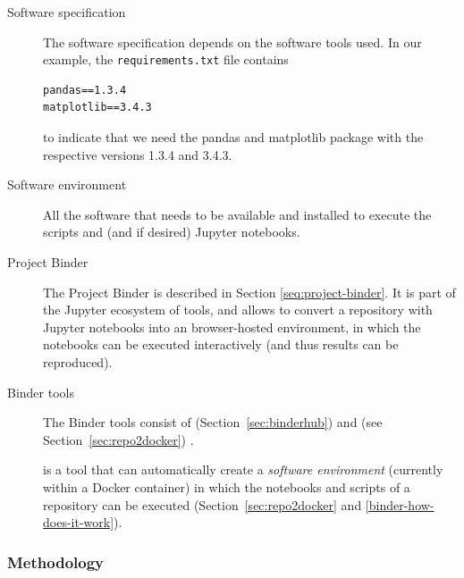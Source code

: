 \begin{description}
\item[Software specification] The software specification depends on the software
  tools used. In our example, the \texttt{requirements.txt} file contains
\begin{verbatim}
pandas==1.3.4
matplotlib==3.4.3
\end{verbatim}
to indicate that we need the pandas and matplotlib package with the respective
versions 1.3.4 and 3.4.3.

\item[Software environment] All the software that needs to be available and
  installed to execute the scripts and (and if desired) Jupyter notebooks.

\item[Project Binder] The Project Binder is described in Section
\ref{seq:project-binder}. It is part of the Jupyter ecosystem of tools, and
allows to convert a repository with Jupyter notebooks into an browser-hosted
environment, in which the notebooks can be executed interactively (and thus
results can be reproduced).

\item[Binder tools] The Binder tools consist of \binderhub{}
  (Section~\ref{sec:binderhub}) and \repotodocker{} (see
  Section~\ref{sec:repo2docker}) .

\item[\repotodocker] \repotodocker{} is a tool that can automatically create a
\emph{software environment} (currently within a Docker container) in which the
notebooks and scripts of a repository can be executed
(Section~\ref{sec:repo2docker} and \ref{binder-how-does-it-work}).
\end{description}




% 

\subsubsection{Methodology}\label{sec:methodology}

